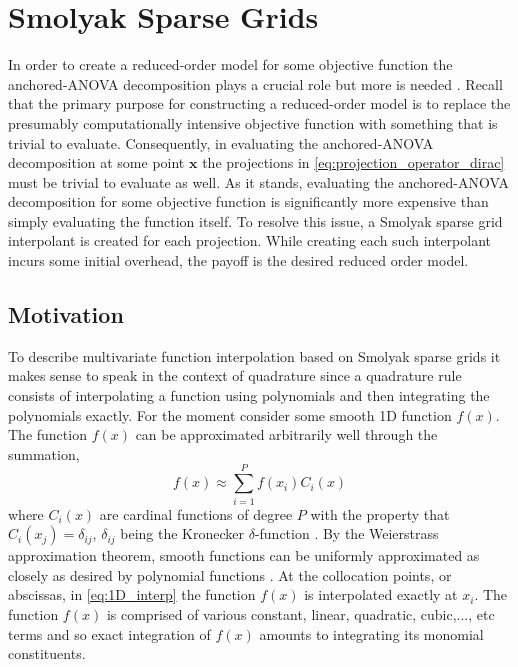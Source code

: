 \section{Smolyak Sparse Grids} \label{sec:smolyak_sg}

In order to create a reduced-order model for some objective function the anchored-\ac{ANOVA} decomposition plays a crucial role but more is needed \cite{Hesthaven_ANOVA}. Recall that the primary purpose for constructing a reduced-order model is to replace the presumably computationally intensive objective function with something that is trivial to evaluate. Consequently, in evaluating the anchored-\ac{ANOVA} decomposition at some point $\textbf{x}$ the projections in  \ref{eq:projection_operator_dirac} must be trivial to evaluate as well. As it stands, evaluating the anchored-\ac{ANOVA} decomposition for some objective function is significantly more expensive than simply evaluating the function itself. To resolve this issue, a Smolyak sparse grid interpolant is created for each projection. While creating each such interpolant incurs some initial overhead, the payoff is the desired reduced order model. 

\subsection{Motivation} \label{subsec:motivation}

To describe multivariate function interpolation based on Smolyak sparse grids it makes sense to speak in the context of quadrature since a quadrature rule consists of interpolating a function using polynomials and then integrating the polynomials exactly. For the moment consider some smooth 1D function $f(x)$. The function $f(x)$ can be approximated arbitrarily well through the summation,
\begin{equation} \label{eq:1D_interp}
   f(x) \approx \sum_{i=1}^{P} f(x_i)C_i(x)
\end{equation}
where $C_i(x)$ are cardinal functions of degree $P$ with the property that $C_i(x_j)=\delta_{ij}$, $\delta_{ij}$ being the Kronecker $\delta$-function \cite{Boyd}. By the Weierstrass approximation theorem, smooth functions can be uniformly approximated as closely as desired by polynomial functions \cite{TrefethenApprox}. At the collocation points, or abscissas, in \ref{eq:1D_interp} the function $f(x)$ is interpolated exactly at $x_i$. The function $f(x)$ is comprised of various constant, linear, quadratic, cubic,..., etc terms and so exact integration of $f(x)$ amounts to integrating its monomial constituents.  

